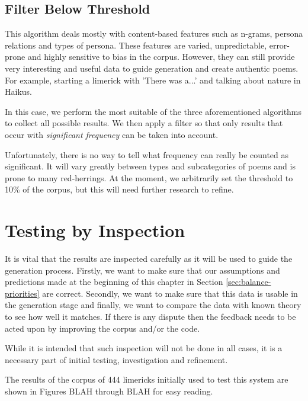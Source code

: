 \subsection{Filter Below Threshold}

This algorithm deals mostly with content-based features such as n-grams, persona relations and types of persona. These features are varied, unpredictable, error-prone and highly sensitive to bias in the corpus. However, they can still provide very interesting and useful data to guide generation and create authentic poems. For example, starting a limerick with 'There was a...' and talking about nature in Haikus.

In this case, we perform the most suitable of the three aforementioned algorithms to collect all possible results. We then apply a filter so that only results that occur with \textit{significant frequency} can be taken into account.

Unfortunately, there is no way to tell what frequency can really be counted as significant. It will vary greatly between types and subcategories of poems and is prone to many red-herrings. At the moment, we arbitrarily set the threshold to 10\% of the corpus, but this will need further research to refine.

\section{Testing by Inspection}

It is vital that the results are inspected carefully as it will be used to guide the generation process. Firstly, we want to make sure that our assumptions and predictions made at the beginning of this chapter in Section \ref{sec:balance-priorities} are correct. Secondly, we want to make sure that this data is usable in the generation stage and finally, we want to compare the data with known theory to see how well it matches. If there is any dispute then the feedback needs to be acted upon by improving the corpus and/or the code.

While it is intended that such inspection will not be done in all cases, it is a necessary part of initial testing, investigation and refinement. 

The results of the corpus of 444 limericks initially used to test this system are shown in Figures BLAH through BLAH for easy reading.

